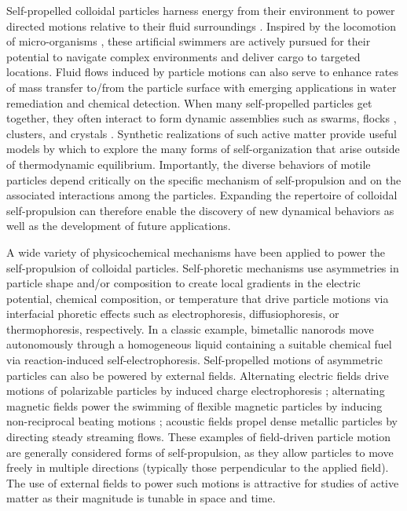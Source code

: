 Self-propelled colloidal particles harness energy from their environment to power directed motions relative to their fluid surroundings \autocite{ebbens2016active,Li2016,Dey2016}.
Inspired by the locomotion of micro-organisms \autocite{Lauga2009}, these artificial swimmers are actively pursued for their potential to navigate complex environments \autocite{Takagi2014,Das2015} and deliver cargo to targeted locations\autocite{Gao2015,Baylis2015}.
Fluid flows induced by particle motions can also serve to enhance rates of mass transfer to/from the particle surface with emerging applications in water remediation\autocite{Soler2013,Li2014} and chemical detection\autocite{morales2014micromotor,kagan2009chemical}.
When many self-propelled particles get together, they often interact to form dynamic assemblies\autocite{Wang2015} such as swarms\autocite{Ibele2009,Nguyen2012}, flocks \autocite{Bricard2013}, clusters\autocite{JieZhang2016}, and crystals \autocite{Palacci2013}.
Synthetic realizations of such active matter\autocite{Marchetti2013} provide useful models by which to explore the many forms of self-organization that arise outside of thermodynamic equilibrium.
Importantly, the diverse behaviors of motile particles depend critically on the specific mechanism of self-propulsion and on the associated interactions among the particles.
Expanding the repertoire of colloidal self-propulsion can therefore enable the discovery of new dynamical behaviors as well as the development of future applications.

A wide variety of physicochemical mechanisms have been applied to power the self-propulsion of colloidal particles.
Self-phoretic mechanisms\autocite{golestanian2007designing} use asymmetries in particle shape and/or composition to create local gradients in the electric potential\autocite{Brown2014}, chemical composition\autocite{Howse2007}, or temperature\autocite{Jiang2010} that drive particle motions via interfacial phoretic effects such as electrophoresis, diffusiophoresis, or thermophoresis, respectively\autocite{Anderson1989}.
In a classic example\autocite{Paxton2004,Fournier-Bidoz2005}, bimetallic nanorods move autonomously through a homogeneous liquid containing a suitable chemical fuel via reaction-induced  self-electrophoresis\autocite{Wang2006,Moran2010}. 
Self-propelled motions of asymmetric particles can also be powered by external fields.
Alternating electric fields drive motions of polarizable particles by induced charge electrophoresis \autocite{Squires2006,Gangwal2008,Boymelgreen2014}; alternating magnetic fields power the swimming of flexible magnetic particles by inducing non-reciprocal beating motions \autocite{Dreyfus2005}; acoustic fields propel dense metallic particles by directing steady streaming flows\autocite{Wang2012,Nadal2014,Ahmed2015}. 
These examples of field-driven particle motion are generally considered forms of self-propulsion, as they allow particles to move freely in multiple directions (typically those perpendicular to the applied field).
The use of external fields to power such motions is attractive for studies of active matter as their magnitude is tunable in space and time.

